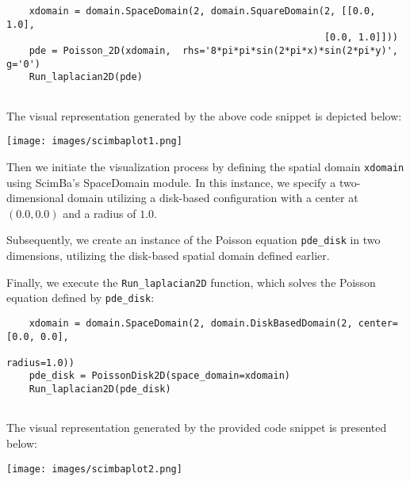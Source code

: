 \documentclass[12pt]{article}
\begin{document}
\begin{lstlisting}
    xdomain = domain.SpaceDomain(2, domain.SquareDomain(2, [[0.0, 1.0], 
                                                        [0.0, 1.0]]))    
    pde = Poisson_2D(xdomain,  rhs='8*pi*pi*sin(2*pi*x)*sin(2*pi*y)', g='0')
    Run_laplacian2D(pde)
    
\end{lstlisting}

The visual representation generated by the above code snippet is depicted below:

\begin{frame}{}
    \begin{center}
        \texttt{[image: images/scimbaplot1.png]}
    \end{center}
\end{frame}



Then we initiate the visualization process by defining the spatial domain \texttt{xdomain} using ScimBa's SpaceDomain module. In this instance, we specify a two-dimensional domain utilizing a disk-based configuration with a center at $(0.0, 0.0)$ and a radius of $1.0$.

Subsequently, we create an instance of the Poisson equation \texttt{pde\_disk} in two dimensions, utilizing the disk-based spatial domain defined earlier.

Finally, we execute the \texttt{Run\_laplacian2D} function, which solves the Poisson equation defined by \texttt{pde\_disk}:

\newpage

\begin{lstlisting}
    xdomain = domain.SpaceDomain(2, domain.DiskBasedDomain(2, center=[0.0, 0.0],
                                                            radius=1.0))
    pde_disk = PoissonDisk2D(space_domain=xdomain)
    Run_laplacian2D(pde_disk)
    
\end{lstlisting}

The visual representation generated by the provided code snippet is presented below:

\begin{frame}{}
    \begin{center}
        \texttt{[image: images/scimbaplot2.png]}
        \end{center}
\end{frame}
\end{document}
